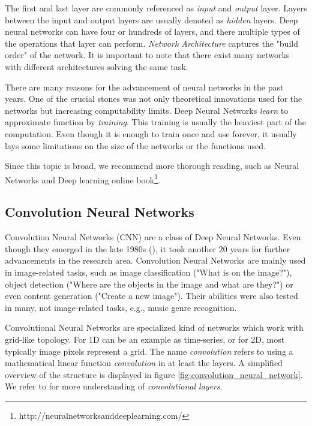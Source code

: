 The first and last layer are commonly referenced as \emph{input} and \emph{output} layer. Layers between the input and output layers are usually denoted as \emph{hidden} layers. Deep neural networks can have four or hundreds of layers, and there multiple types of the operations that layer can perform. \emph{Network Architecture} captures the "build order" of the network. It is important to note that there exist many networks with different architectures solving the same task.

There are many reasons for the advancement of neural networks in the past years. One of the crucial stones was not only theoretical innovations used for the networks but increasing computability limits. Deep Neural Networks \emph{learn} to approximate function by \emph{training}. This training is usually the heaviest part of the computation. Even though it is enough to train once and use forever, it usually lays some limitations on the size of the networks or the functions used.

Since this topic is broad, we recommend more thorough reading, such as Neural Networks and Deep learning online book\footnote{http://neuralnetworksanddeeplearning.com/}.

\subsection{Convolution Neural Networks}

Convolution Neural Networks (CNN) are a class of Deep Neural Networks. Even though they emerged in the late 1980s (\cite{lecun1989backpropagation}), it took another 20 years for further advancements in the research area. Convolution Neural Networks are mainly used in image-related tasks, such as image classification ("What is on the image?"), object detection ("Where are the objects in the image and what are they?") or even content generation ("Create a new image"). Their abilities were also tested in many, not image-related tasks, e.g., music genre recognition.

Convolutional Neural Networks are specialized kind of networks which work with grid-like topology. For 1D can be an example as time-series, or for 2D, most typically image pixels represent a grid. The name \emph{convolution} refers to using a mathematical linear function \emph{convolution} in at least the layers. A simplified overview of the structure is displayed in figure \ref{fig:convolution_neural_network}. We refer to \cite{Goodfellow-et-al-2016} for more understanding of \emph{convolutional layers}.

